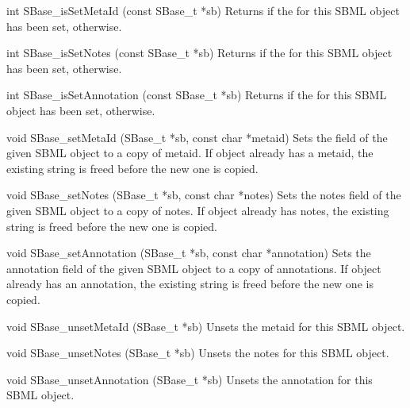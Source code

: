 \documentclass{sbmlmanual}
\begin{document}
\begin{methoddef}{int SBase\_isSetMetaId (const SBase\_t *sb)}
  Returns  if the  for this SBML object has been
  set,  otherwise.
\end{methoddef}


\begin{methoddef}{int SBase\_isSetNotes (const SBase\_t *sb)}
  Returns  if the  for this SBML object has been set,
   otherwise.
\end{methoddef}


\begin{methoddef}{int SBase\_isSetAnnotation (const SBase\_t *sb)}
  Returns  if the  for this SBML object has been
  set,  otherwise.
\end{methoddef}


\begin{methoddef}{void SBase\_setMetaId (SBase\_t *sb, const char *metaid)}
  Sets the  field of the given SBML object to a copy of
  metaid.  If object already has a metaid, the existing string is freed
  before the new one is copied.
\end{methoddef}


\begin{methoddef}{void SBase\_setNotes (SBase\_t *sb, const char *notes)}
  Sets the notes field of the given SBML object to a copy of notes.  If
  object already has notes, the existing string is freed before the new
  one is copied.
\end{methoddef}


\begin{methoddef}{void SBase\_setAnnotation (SBase\_t *sb, const char *annotation)}
  Sets the annotation field of the given SBML object to a copy of
  annotations.  If object already has an annotation, the existing string
  is freed before the new one is copied.
\end{methoddef}


\begin{methoddef}{void SBase\_unsetMetaId (SBase\_t *sb)}
  Unsets the metaid for this SBML object.
\end{methoddef}


\begin{methoddef}{void SBase\_unsetNotes (SBase\_t *sb)}
  Unsets the notes for this SBML object.
\end{methoddef}


\begin{methoddef}{void SBase\_unsetAnnotation (SBase\_t *sb)}
  Unsets the annotation for this SBML object.
\end{methoddef}
\end{document}
